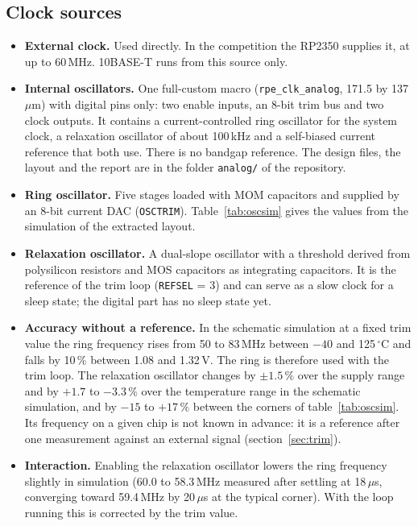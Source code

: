 \documentclass[10pt,a4paper]{article}
\newcommand{\reg}[1]{\texttt{#1}}
\begin{document}
\subsection{Clock sources}\label{sec:clksrc}

\begin{itemize}
\item \textbf{External clock.} Used directly. In the competition the RP2350 supplies it, at up to 60\,MHz.
10BASE-T runs from this source only.
\item \textbf{Internal oscillators.} One full-custom macro (\texttt{rpe\_clk\_analog}, 171.5 by 137\,$\mu$m)
with digital pins only: two enable inputs, an 8-bit trim bus and two clock outputs. It contains a
current-controlled ring oscillator for the system clock, a relaxation oscillator of about 100\,kHz and a
self-biased current reference that both use. There is no bandgap reference. The design files, the layout and
the report are in the folder \texttt{analog/} of the repository.
\item \textbf{Ring oscillator.} Five stages loaded with MOM capacitors and supplied by an 8-bit current DAC
(\reg{OSCTRIM}). Table~\ref{tab:oscsim} gives the values from the simulation of the extracted layout.
\item \textbf{Relaxation oscillator.} A dual-slope oscillator with a threshold derived from polysilicon
resistors and MOS capacitors as integrating capacitors. It is the reference of the trim loop
(\reg{REFSEL} = 3) and can serve as a slow clock for a sleep state; the digital part has no sleep state yet.
\item \textbf{Accuracy without a reference.} In the schematic simulation at a fixed trim value the ring
frequency rises from 50 to 83\,MHz between $-40$ and 125\,$^\circ$C and falls by 10\,\% between 1.08 and 1.32\,V.
The ring is therefore used with the trim loop. The relaxation oscillator changes by $\pm 1.5\,\%$ over the supply
range and by $+1.7$ to $-3.3\,\%$ over the temperature range in the schematic simulation, and by $-15$ to
$+17\,\%$ between the corners of table~\ref{tab:oscsim}. Its frequency on a given chip is not known in advance:
it is a reference after one measurement against an external signal (section~\ref{sec:trim}).
\item \textbf{Interaction.} Enabling the relaxation oscillator lowers the ring frequency slightly in simulation
(60.0 to 58.3\,MHz measured after settling at 18\,$\mu$s, converging toward 59.4\,MHz by 20\,$\mu$s at the typical corner). With the loop running this is corrected by the trim value.

\end{itemize}
\end{document}
